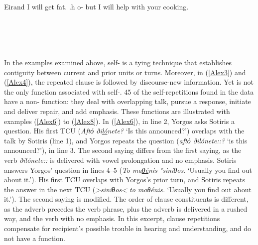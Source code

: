 \documentclass[output=paper]{LSP/langsci}
\begin{document}
\begin{Transcript}[FS {>}{>\hspace{0.1in}}]{Eir}{and I will get fat. .h o- but I will help with your cooking.}
\\
   \\   
 \\
   \\  
    \\    
\end{Transcript}

In the examples examined above, self- is a tying technique that establishes contiguity between current and prior units or turns. Moreover, in (\ref{Alex3}) and (\ref{Alex4}), the repeated clause is followed by discourse-new information. Yet  is not the only function associated with self-. 45 of the self-repetitions found in the data have a non- function: they deal with overlapping talk, pursue a response, initiate and deliver repair, and add emphasis. These functions are illustrated with examples (\ref{Alex6}) to (\ref{Alex8}). In (\ref{Alex6}), in line 2, Yorgos asks Sotiris a question. His first TCU (\textit{Αftό ði\underline{ló}nete?} `Is this announced?') overlaps with the talk by Sotiris (line 1), and Yorgos repeats the question (\textit{aftό ðilónete::?} `is this announced?'), in line 3. The second saying differs from the first saying, as the verb \textit{ðilónete::} is delivered with vowel prolongation and no emphasis. Sotiris answers Yorgos’ question in lines 4--5 (\textit{To ma\underline{θé}nis °siníθos}. `Usually you find out about it.'). His first TCU overlaps with Yorgos’s prior turn, and Sotiris repeats the answer in the next TCU (\textit{>siníθos< to maθénis.} `Usually you find out about it.'). The second saying is modified. The order of clause constituents is different, as the adverb precedes the verb phrase, plus the adverb is delivered in a rushed way, and the verb with no emphasis. In this excerpt, clause repetitions compensate for recipient’s possible trouble in hearing and understanding, and do not have a  function. 
\end{document}
